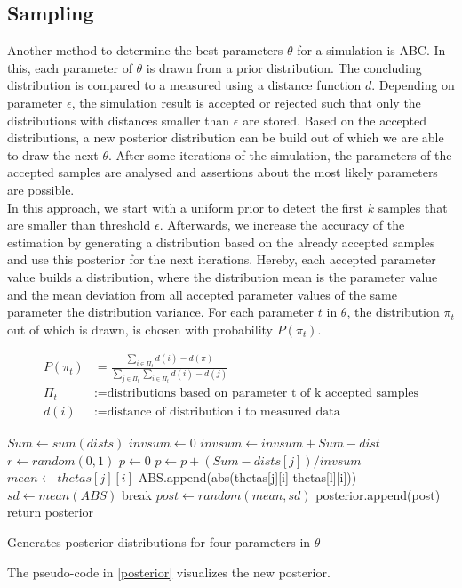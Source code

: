 \subsection{Sampling}
\label{Sampling}
Another method to determine the best parameters $\theta$ for a simulation is \acf{ABC}. In this, each parameter of $\theta$ is drawn from a prior distribution. The concluding distribution is compared to a measured using a distance function $d$. Depending on parameter $\epsilon$, the simulation result is accepted or rejected such that only the distributions with distances smaller than $\epsilon$ are stored. Based on the accepted distributions, a new posterior distribution can be build out of which we are able to draw the next $\theta$. After some iterations of the simulation, the parameters of the accepted samples are analysed and assertions about the most likely parameters are possible.\\
In this approach, we start with a uniform prior to detect the first $k$ samples that are smaller than threshold $\epsilon$. Afterwards, we increase the accuracy of the estimation by generating a distribution based on the already accepted samples and use this posterior for the next iterations. Hereby, each accepted parameter value builds a distribution, where the distribution mean is the parameter value and the mean deviation from all accepted parameter values of the same parameter the distribution variance. For each parameter $t$ in $\theta$, the distribution $\pi_t$ out of which is drawn, is chosen with probability $P(\pi_t)$.
\begin{center}
\begin{align*}
P(\pi_t) &= \frac{\sum_{i \in \Pi_t}{d(i)}-d(\pi)}{\sum_{j \in \Pi_t}{\sum_{i \in \Pi_t}{d(i)}-d(j)}}\\
\Pi_t &:= \text{distributions based on parameter t of k accepted samples}\\
d(i) &:= \text{distance of distribution i to measured data}
\end{align*}
\end{center}

\begin{algorithm}
\begin{algorithmic}
 
	\State $Sum \gets sum(dists)$
	\State $invsum \gets 0$
		\State $invsum \gets invsum + Sum - dist$
	\EndFor
	\State $r \gets random(0,1)$
	\State $p \gets 0$
		\State $p \gets p + (Sum - dists[j])/invsum$
			\State $mean \gets thetas[j][i]$
				\State ABS.append(abs(thetas[j][i]-thetas[l][i]))
			\EndFor
			\State $sd \gets mean(ABS)$
			\State break
		\EndIf
		\State $post \gets random(mean, sd)$
		\State posterior.append(post)
	\EndFor
\EndFor
\State return posterior
\EndProcedure
\end{algorithmic}
\caption{\label{posterior} Generates posterior distributions for four parameters in $\theta$}
\end{algorithm}
The pseudo-code in \ref{posterior} visualizes the new posterior.\\

